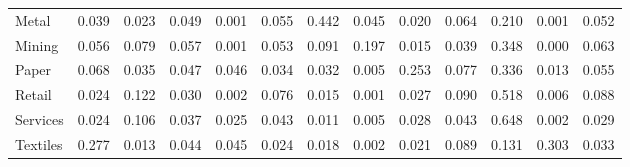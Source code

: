\begin{table}[htbp]
\begin{tabular}{lcccccccccccc}
  Metal & \textcolor[RGB]{122,79,133}{0.039} & \textcolor[RGB]{168,109,87}{0.023} & \textcolor[RGB]{99,64,156}{0.049} & \textcolor[RGB]{244,158,11}{0.001} & \textcolor[RGB]{89,57,166}{0.055} & \textcolor[RGB]{11,7,244}{0.442} & \textcolor[RGB]{113,73,142}{0.045} & \textcolor[RGB]{177,115,78}{0.020} & \textcolor[RGB]{74,48,181}{0.064} & \textcolor[RGB]{28,18,227}{0.210} & \textcolor[RGB]{239,155,16}{0.001} & \textcolor[RGB]{94,61,161}{0.052} \\ 
  Mining & \textcolor[RGB]{87,56,168}{0.056} & \textcolor[RGB]{62,40,193}{0.079} & \textcolor[RGB]{85,55,170}{0.057} & \textcolor[RGB]{241,156,14}{0.001} & \textcolor[RGB]{92,60,163}{0.053} & \textcolor[RGB]{48,31,207}{0.091} & \textcolor[RGB]{34,22,221}{0.197} & \textcolor[RGB]{188,121,67}{0.015} & \textcolor[RGB]{124,80,131}{0.039} & \textcolor[RGB]{14,9,241}{0.348} & \textcolor[RGB]{246,159,9}{0.000} & \textcolor[RGB]{78,50,177}{0.063} \\ 
  Paper & \textcolor[RGB]{71,46,184}{0.068} & \textcolor[RGB]{131,85,124}{0.035} & \textcolor[RGB]{108,70,147}{0.047} & \textcolor[RGB]{110,71,145}{0.046} & \textcolor[RGB]{133,86,122}{0.034} & \textcolor[RGB]{136,88,119}{0.032} & \textcolor[RGB]{218,141,37}{0.005} & \textcolor[RGB]{23,15,232}{0.253} & \textcolor[RGB]{64,41,191}{0.077} & \textcolor[RGB]{18,11,237}{0.336} & \textcolor[RGB]{191,124,64}{0.013} & \textcolor[RGB]{90,58,165}{0.055} \\ 
  Retail & \textcolor[RGB]{159,103,96}{0.024} & \textcolor[RGB]{42,27,212}{0.122} & \textcolor[RGB]{138,89,117}{0.030} & \textcolor[RGB]{230,149,25}{0.002} & \textcolor[RGB]{66,42,189}{0.076} & \textcolor[RGB]{184,119,71}{0.015} & \textcolor[RGB]{234,151,21}{0.001} & \textcolor[RGB]{154,100,101}{0.027} & \textcolor[RGB]{50,32,205}{0.090} & \textcolor[RGB]{5,3,250}{0.518} & \textcolor[RGB]{211,136,44}{0.006} & \textcolor[RGB]{53,34,202}{0.088} \\ 
  Services & \textcolor[RGB]{161,104,94}{0.024} & \textcolor[RGB]{44,29,211}{0.106} & \textcolor[RGB]{126,81,129}{0.037} & \textcolor[RGB]{156,101,99}{0.025} & \textcolor[RGB]{117,76,138}{0.043} & \textcolor[RGB]{202,131,53}{0.011} & \textcolor[RGB]{216,140,39}{0.005} & \textcolor[RGB]{145,94,110}{0.028} & \textcolor[RGB]{119,77,136}{0.043} & \textcolor[RGB]{2,1,253}{0.648} & \textcolor[RGB]{227,147,28}{0.002} & \textcolor[RGB]{142,92,113}{0.029} \\ 
  Textiles & \textcolor[RGB]{21,14,234}{0.277} & \textcolor[RGB]{195,126,60}{0.013} & \textcolor[RGB]{115,74,140}{0.044} & \textcolor[RGB]{112,72,143}{0.045} & \textcolor[RGB]{158,102,97}{0.024} & \textcolor[RGB]{179,116,76}{0.018} & \textcolor[RGB]{228,148,27}{0.002} & \textcolor[RGB]{174,112,81}{0.021} & \textcolor[RGB]{51,33,204}{0.089} & \textcolor[RGB]{41,26,214}{0.131} & \textcolor[RGB]{19,13,236}{0.303} & \textcolor[RGB]{135,87,120}{0.033} \\ 

\end{tabular}
\end{table}
